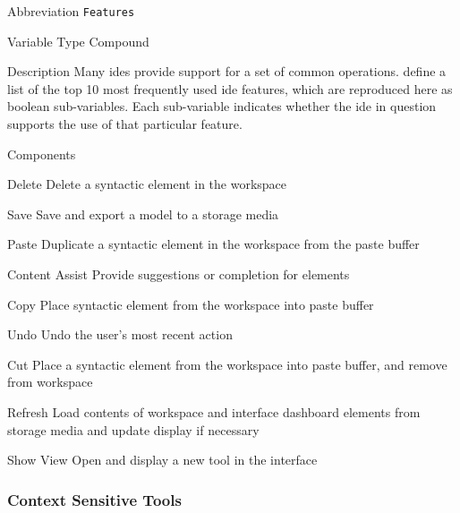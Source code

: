 \begin{AlignedDesc}
  \item[Abbreviation] \texttt{Features}

  \item[Variable Type] Compound

  \item[Description] Many \acp{ide} provide support for a set of common
  operations. \citeauthor{murphy2006} define a list of the top 10 most
  frequently used \ac{ide} features, which are reproduced here as boolean
  sub-variables. \cite{murphy2006} Each sub-variable indicates whether the
  \ac{ide} in question supports the use of that particular feature.

  \item[Components]

  \begin{AlignedDesc}
    \item[Delete] Delete a syntactic element in the workspace
    \item[Save] Save and export a model to a storage media
    \item[Paste] Duplicate a syntactic element in the workspace from the
    paste buffer
    \item[Content Assist] Provide suggestions or completion for elements
    \item[Copy] Place syntactic element from the workspace into paste
    buffer
    \item[Undo] Undo the user's most recent action
    \item[Cut] Place a syntactic element from the workspace into paste
    buffer, and remove from workspace
    \item[Refresh] Load contents of workspace and interface dashboard
    elements from storage media and update display if necessary
    \item[Show View] Open and display a new tool in the interface
  \end{AlignedDesc}

\end{AlignedDesc}

\subsubsection{Context Sensitive Tools}
\label{subsubsec:context}

